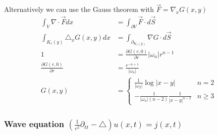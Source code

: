 \documentclass[10pt,a4paper]{book}
\theoremstyle{definition}
\begin{document}
Alternatively we can use the Gauss theorem with $\vec{F}=\nabla_x G(x,y)$
\begin{align}
    \int_V \nabla\cdot \vec{F} dx&=\int_{\partial V} \vec{F}\cdot d\vec{S}\\
    \int_{K_r(y)} \triangle_x G(x,y) dx&=\int_{\partial _{K_r(y)}} \nabla G\cdot d\vec{S}\\
    1&=\frac{\partial G(r,0)}{\partial r}|\omega_{n}|r^{n-1}\\
    \frac{\partial G(r,0)}{\partial r} &= \frac{r^{-n+1}}{|\omega_n|}\\
    G(x,y)&=\left\{\begin{array}{cc}
         \frac{1}{|\omega_2|}\log{|x-y|}                    & n=2  \\
         -\frac{1}{|\omega_n|(n-2)}\frac{1}{|x-y|^{n-2}}    & n\ge3 
    \end{array}\right.
\end{align}

\newpage
\subsubsection{Wave equation \texorpdfstring{$\left(\frac{1}{c^2}\partial_{tt}-\triangle\right) u(x,t)= j(x,t)$}{TEXT}}
\end{document}

